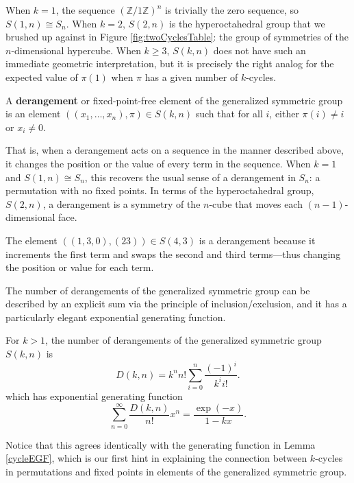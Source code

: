 When $k = 1$, the sequence $(\mathbb{Z}/1\mathbb{Z})^n$ is trivially the zero
sequence, so $S(1,n) \cong S_n$.
When $k = 2$, $S(2,n)$ is the hyperoctahedral group that we brushed up against
in Figure \ref{fig:twoCyclesTable}:
the group of symmetries of the $n$-dimensional hypercube.
When $k \geq 3$, $S(k,n)$ does not have such an immediate geometric interpretation,
but it is precisely the right analog for the expected value of $\pi(1)$ when
$\pi$ has a given number of $k$-cycles.

\begin{definition}
  A \textbf{derangement} or fixed-point-free element
  of the generalized symmetric group is an element
  $((x_1,\dots,x_n),\pi) \in S(k,n)$ such that for all $i$,
  either $\pi(i) \neq i$ or $x_i \neq 0$.
\end{definition}

That is, when a derangement acts on a sequence in the manner described above,
it changes the position or the value of every term in the sequence.
When $k = 1$ and $S(1,n) \cong S_n$, this recovers the usual sense of a
derangement in $S_n$: a permutation with no fixed points.
In terms of the hyperoctahedral group, $S(2,n)$, a derangement is a symmetry of
the $n$-cube that moves each $(n-1)$-dimensional face.

\begin{example}
  The element $((1,3,0), (23)) \in S(4,3)$ is a derangement because it
  increments the first term and swaps the second and third terms---thus
  changing the position or value for each term.
\end{example}

The number of derangements of the generalized symmetric group can be described
by an explicit sum via the principle of inclusion/exclusion, and it has a
particularly elegant exponential generating function.

\begin{theorem} %
  \label{derangementEGF}
  For $k > 1$, the number of derangements of the generalized symmetric group $S(k,n)$ is
  \begin{equation}
    D(k,n) = k^n n!\sum_{i=0}^n \frac{(-1)^i}{k^i i!}.
  \end{equation} which has exponential generating function
  \begin{equation}
    \sum_{n=0}^\infty \frac{D(k,n)}{n!}x^n = \frac{\exp(-x)}{1 - kx}.
  \end{equation}
\end{theorem}
Notice that this agrees identically with the generating function in
Lemma \ref{cycleEGF}, which is our first hint in explaining the connection
between $k$-cycles in permutations and fixed points in elements of the
generalized symmetric group.
